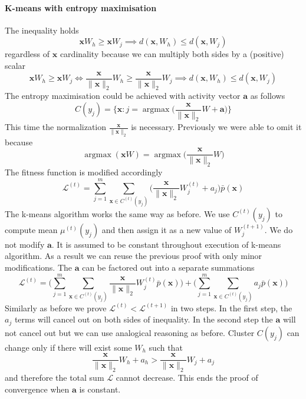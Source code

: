 \documentclass[12pt]{article}
\DeclareMathOperator*{\argmax}{argmax}
\begin{document}
\paragraph{K-means with entropy maximisation}
The inequality holds
\[
\boldsymbol{x}W_h \ge \boldsymbol{x}W_j \implies d(\boldsymbol{x},W_h) \le d(\boldsymbol{x},W_j)
\]
regardless of $\boldsymbol{x}$ cardinality because we can multiply both sides by a (positive) scalar
\[
\boldsymbol{x}W_h \ge \boldsymbol{x}W_j \iff  \frac{\boldsymbol{x}}{\lVert\boldsymbol{x}\rVert_2}W_h \ge \frac{\boldsymbol{x}}{\lVert\boldsymbol{x}\rVert_2}W_j \implies d(\boldsymbol{x},W_h) \le d(\boldsymbol{x},W_j)
\]
The entropy maximisation could be achieved with  activity vector $\boldsymbol{a}$ as follows
\[
C(y_j) = \{\boldsymbol{x} : j=\argmax\big(\frac{\boldsymbol{x}}{\lVert\boldsymbol{x}\rVert_2}W+\boldsymbol{a}\big)\}
\]
This time the normalization $\frac{\boldsymbol{x}}{\lVert\boldsymbol{x}\rVert_2}$ is necessary. Previously we were able to omit it because 
\[\argmax(\boldsymbol{x}W)=\argmax\big(\frac{\boldsymbol{x}}{\lVert\boldsymbol{x}\rVert_2}W\big)\]
The fitness function is modified accordingly
\[
\mathcal{L}^{(t)} = \sum_{j=1}^m \sum_{\boldsymbol{x}\in C^{(t)}(y_j)} \big( \frac{\boldsymbol{x}}{\lVert \boldsymbol{x} \rVert_2} W_j^{(t)}+a_j\big) \bar{p}(\boldsymbol{x})
\] 
The k-means algorithm works the same way as before. We use $ C^{(t)}(y_j)$ to compute mean $\mu^{(t)}(y_j)$ and then assign it as a new value of $W_j^{(t+1)}$. We do not modify $\boldsymbol{a}$. It is assumed to be constant throughout execution of k-means algorithm. As a result we can reuse the previous proof with only minor modifications.
The $\boldsymbol{a}$ can be factored out into a separate summations
\[
\mathcal{L}^{(t)} = \Big(\sum_{j=1}^m \sum_{\boldsymbol{x}\in C^{(t)}(y_j)} \frac{\boldsymbol{x}}{\lVert \boldsymbol{x} \rVert_2} W_j^{(t)} \bar{p}(\boldsymbol{x})\Big) + \Big(\sum_{j=1}^m \sum_{\boldsymbol{x}\in C^{(t)}(y_j)} a_j\bar{p}(\boldsymbol{x}) \Big)
\] 
Similarly as before we prove $\mathcal{L}^{(t)}<\mathcal{L}^{(t+1)}$ in two steps. In the first step, the $a_j$ terms will cancel out on both sides of inequality. In the second step the $\boldsymbol{a}$ will not cancel out but we can use analogical reasoning as before. Cluster $C(y_j)$ can change only if there will exist some $W_h$ such that 
\[
\frac{\boldsymbol{x}}{\lVert\boldsymbol{x}\rVert_2}W_h+a_h > \frac{\boldsymbol{x}}{\lVert\boldsymbol{x}\rVert_2}W_j+a_j
\]
and therefore the total sum $\mathcal{L}$ cannot decrease. This ends the proof of convergence when $\boldsymbol{a}$ is constant.
\end{document}

